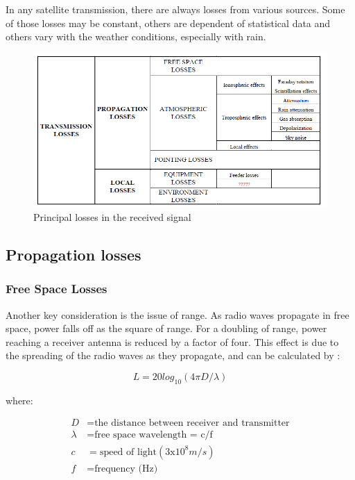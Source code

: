 In any satellite transmission, there are always losses from various sources. Some of
those losses may be constant, others are dependent of statistical data and others vary
with the weather conditions, especially with rain.

\begin{figure}[H]
	\includegraphics[scale=0.8]{./sections/SatelliteDept/sections/images/principal_losses}
	\centering
	\caption{Principal losses in the received signal \cite{Jorge2012}}
	\label{principal_losses}
\end{figure}

\subsection{Propagation losses}
\subsubsection{Free Space Losses}
Another key consideration is the issue of range. As radio waves propagate in free space, power falls off as the square of range. For a doubling of range, power reaching a receiver antenna is reduced by a factor of four. This effect is due to the spreading of the radio waves as they propagate, and can be calculated by \cite{Note1998}:

\begin{equation}
L=20log_{10}(4\pi D/\lambda)
\label{FSP}
\end{equation}

where:

\begin{align*}
	D&= \text{the distance between receiver and transmitter}\\
	\lambda&= \text{free space wavelength = c/f}\\
	c&= \text{speed of light}(3\mathrm{x}10^8m/s)\\
	f&= \text{frequency (Hz)}
\end{align*}

